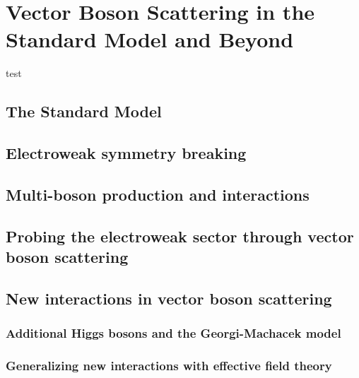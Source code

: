 \chapter{Vector Boson Scattering in the Standard Model and Beyond}
\label{ch:phenomenology}
test

\section{The Standard Model}
\section{Electroweak symmetry breaking}
\section{Multi-boson production and interactions}
\section{Probing the electroweak sector through vector boson scattering}
\section{New interactions in vector boson scattering}
\subsection{Additional Higgs bosons and the Georgi-Machacek model}
\subsection{Generalizing new interactions with effective field theory}
